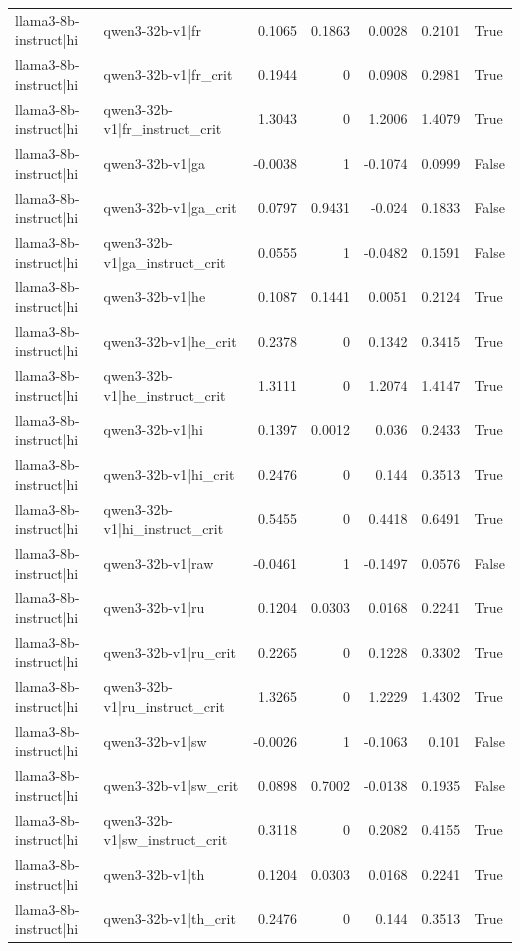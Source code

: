 \begin{table}
\begin{tabular}{l l r r r r l}
llama3-8b-instruct|hi & qwen3-32b-v1|fr & 0.1065 & 0.1863 & 0.0028 & 0.2101 & True \\
llama3-8b-instruct|hi & qwen3-32b-v1|fr_crit & 0.1944 & 0 & 0.0908 & 0.2981 & True \\
llama3-8b-instruct|hi & qwen3-32b-v1|fr_instruct_crit & 1.3043 & 0 & 1.2006 & 1.4079 & True \\
llama3-8b-instruct|hi & qwen3-32b-v1|ga & -0.0038 & 1 & -0.1074 & 0.0999 & False \\
llama3-8b-instruct|hi & qwen3-32b-v1|ga_crit & 0.0797 & 0.9431 & -0.024 & 0.1833 & False \\
llama3-8b-instruct|hi & qwen3-32b-v1|ga_instruct_crit & 0.0555 & 1 & -0.0482 & 0.1591 & False \\
llama3-8b-instruct|hi & qwen3-32b-v1|he & 0.1087 & 0.1441 & 0.0051 & 0.2124 & True \\
llama3-8b-instruct|hi & qwen3-32b-v1|he_crit & 0.2378 & 0 & 0.1342 & 0.3415 & True \\
llama3-8b-instruct|hi & qwen3-32b-v1|he_instruct_crit & 1.3111 & 0 & 1.2074 & 1.4147 & True \\
llama3-8b-instruct|hi & qwen3-32b-v1|hi & 0.1397 & 0.0012 & 0.036 & 0.2433 & True \\
llama3-8b-instruct|hi & qwen3-32b-v1|hi_crit & 0.2476 & 0 & 0.144 & 0.3513 & True \\
llama3-8b-instruct|hi & qwen3-32b-v1|hi_instruct_crit & 0.5455 & 0 & 0.4418 & 0.6491 & True \\
llama3-8b-instruct|hi & qwen3-32b-v1|raw & -0.0461 & 1 & -0.1497 & 0.0576 & False \\
llama3-8b-instruct|hi & qwen3-32b-v1|ru & 0.1204 & 0.0303 & 0.0168 & 0.2241 & True \\
llama3-8b-instruct|hi & qwen3-32b-v1|ru_crit & 0.2265 & 0 & 0.1228 & 0.3302 & True \\
llama3-8b-instruct|hi & qwen3-32b-v1|ru_instruct_crit & 1.3265 & 0 & 1.2229 & 1.4302 & True \\
llama3-8b-instruct|hi & qwen3-32b-v1|sw & -0.0026 & 1 & -0.1063 & 0.101 & False \\
llama3-8b-instruct|hi & qwen3-32b-v1|sw_crit & 0.0898 & 0.7002 & -0.0138 & 0.1935 & False \\
llama3-8b-instruct|hi & qwen3-32b-v1|sw_instruct_crit & 0.3118 & 0 & 0.2082 & 0.4155 & True \\
llama3-8b-instruct|hi & qwen3-32b-v1|th & 0.1204 & 0.0303 & 0.0168 & 0.2241 & True \\
llama3-8b-instruct|hi & qwen3-32b-v1|th_crit & 0.2476 & 0 & 0.144 & 0.3513 & True \\

\end{tabular}
\end{table}
